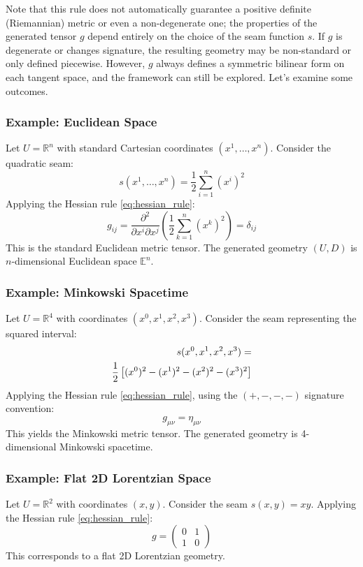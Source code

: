 \documentclass[twoside,twocolumn]{article}
\numberwithin{equation}{section} %
\begin{document}
\noindent Note that this rule does not automatically guarantee a positive definite (Riemannian) metric or even a non-degenerate one; the properties of the generated tensor $g$ depend entirely on the choice of the seam function $s$. If $g$ is degenerate or changes signature, the resulting geometry may be non-standard or only defined piecewise. However, $g$ always defines a symmetric bilinear form on each tangent space, and the framework can still be explored. Let's examine some outcomes.

\subsubsection{Example: Euclidean Space}
Let $U = \mathbb{R}^n$ with standard Cartesian coordinates $(x^1, \dots, x^n)$. Consider the quadratic seam:
$$ s(x^1, \dots, x^n) = \frac{1}{2} \sum_{i=1}^n (x^i)^2 $$
Applying the Hessian rule \eqref{eq:hessian_rule}:
$$ g_{ij} = \frac{\partial^2}{\partial x^i \partial x^j} \left( \frac{1}{2} \sum_{k=1}^n (x^k)^2 \right) = \delta_{ij} $$
This is the standard Euclidean metric tensor. The generated geometry $(U, D)$ is $n$-dimensional Euclidean space $\mathbb{E}^n$.

\subsubsection{Example: Minkowski Spacetime}
Let $U = \mathbb{R}^4$ with coordinates $(x^0, x^1, x^2, x^3)$. Consider the seam representing the squared interval:
\begin{align}
s(x^0, x^1, x^2, x^3) = \notag \\ \frac{1}{2} \left[ (x^0)^2 - (x^1)^2 - (x^2)^2 - (x^3)^2 \right]
\end{align}
Applying the Hessian rule \eqref{eq:hessian_rule}, using the $(+,-,-,-)$ signature convention:
$$ g_{\mu\nu} = \eta_{\mu\nu} $$
This yields the Minkowski metric tensor. The generated geometry is 4-dimensional Minkowski spacetime.

\subsubsection{Example: Flat 2D Lorentzian Space}
Let $U = \mathbb{R}^2$ with coordinates $(x, y)$. Consider the seam $s(x, y) = xy$. Applying the Hessian rule \eqref{eq:hessian_rule}:
$$ g = \begin{pmatrix} 0 & 1 \\ 1 & 0 \end{pmatrix} $$
This corresponds to a flat 2D Lorentzian geometry.
\end{document}

